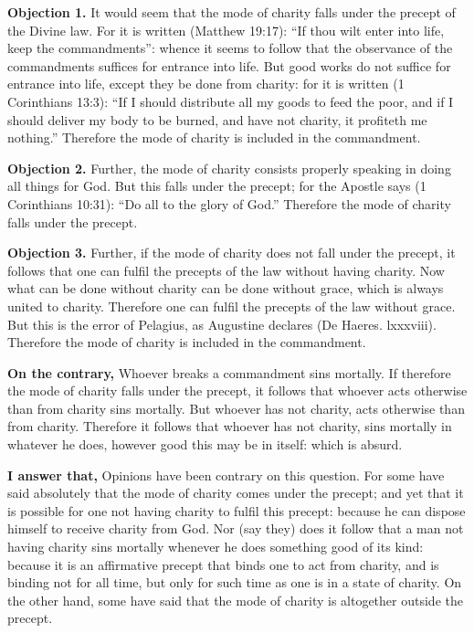 
\textbf{Objection 1.} It would seem that the mode of charity falls under the precept of the Divine law. For it is written (Matthew 19:17): ``If thou wilt enter into life, keep the commandments'': whence it seems to follow that the observance of the commandments suffices for entrance into life. But good works do not suffice for entrance into life, except they be done from charity: for it is written (1 Corinthians 13:3): ``If I should distribute all my goods to feed the poor, and if I should deliver my body to be burned, and have not charity, it profiteth me nothing.'' Therefore the mode of charity is included in the commandment.

\textbf{Objection 2.} Further, the mode of charity consists properly speaking in doing all things for God. But this falls under the precept; for the Apostle says (1 Corinthians 10:31): ``Do all to the glory of God.'' Therefore the mode of charity falls under the precept.

\textbf{Objection 3.} Further, if the mode of charity does not fall under the precept, it follows that one can fulfil the precepts of the law without having charity. Now what can be done without charity can be done without grace, which is always united to charity. Therefore one can fulfil the precepts of the law without grace. But this is the error of Pelagius, as Augustine declares (De Haeres. lxxxviii). Therefore the mode of charity is included in the commandment.

\textbf{On the contrary,} Whoever breaks a commandment sins mortally. If therefore the mode of charity falls under the precept, it follows that whoever acts otherwise than from charity sins mortally. But whoever has not charity, acts otherwise than from charity. Therefore it follows that whoever has not charity, sins mortally in whatever he does, however good this may be in itself: which is absurd.

\textbf{I answer that,} Opinions have been contrary on this question. For some have said absolutely that the mode of charity comes under the precept; and yet that it is possible for one not having charity to fulfil this precept: because he can dispose himself to receive charity from God. Nor (say they) does it follow that a man not having charity sins mortally whenever he does something good of its kind: because it is an affirmative precept that binds one to act from charity, and is binding not for all time, but only for such time as one is in a state of charity. On the other hand, some have said that the mode of charity is altogether outside the precept.

